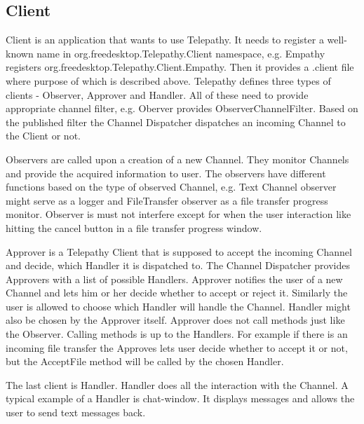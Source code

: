 \subsection*{Client}\label{subsect:tpClient}
Client is an application that wants to use Telepathy. It needs to register a well-known name in org.freedesktop.Telepathy.Client namespace, e.g. Empathy registers org.freedesktop.Telepathy.Client.Empathy. Then it provides a .client file where purpose of which is described above. Telepathy defines three types of clients - Observer, Approver and Handler. All of these need to provide appropriate channel filter, e.g. Oberver provides ObserverChannelFilter. Based on the published filter the Channel Dispatcher dispatches an incoming Channel to the Client or not.\cite{TPWiki}  

Observers are called upon a creation of a new Channel. They monitor Channels and provide the acquired information to user. The observers have different functions based on the type of observed Channel, e.g. Text Channel observer might serve as a logger and FileTransfer observer as a file transfer progress monitor. Observer is must not interfere except for when the user interaction like hitting the cancel button in a file transfer progress window.\cite{TPWiki}     

Approver is a Telepathy Client that is supposed to accept the incoming Channel and decide, which Handler it is dispatched to. The Channel Dispatcher provides Approvers with a list of possible Handlers. Approver notifies the user of a new Channel and lets him or her decide whether to accept or reject it. Similarly the user is allowed to choose which Handler will handle the Channel. Handler might also be chosen by the Approver itself. Approver does not call methods just like the Observer. Calling methods is up to the Handlers. For example if there is an incoming file transfer the Approves lets user decide whether to accept it or not, but the AcceptFile method will be called by the chosen Handler.\cite{TPWiki}  

The last client is Handler. Handler does all the interaction with the Channel. A typical example of a Handler is chat-window. It displays messages and allows the user to send text messages back.\cite{TPWiki}  



